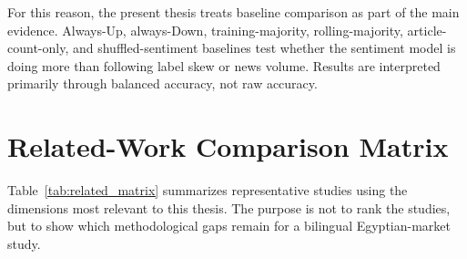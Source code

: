 For this reason, the present thesis treats baseline comparison as part of the main evidence. Always-Up, always-Down, training-majority, rolling-majority, article-count-only, and shuffled-sentiment baselines test whether the sentiment model is doing more than following label skew or news volume. Results are interpreted primarily through balanced accuracy, not raw accuracy.

\section{Related-Work Comparison Matrix}

Table~\ref{tab:related_matrix} summarizes representative studies using the dimensions most relevant to this thesis. The purpose is not to rank the studies, but to show which methodological gaps remain for a bilingual Egyptian-market study.


